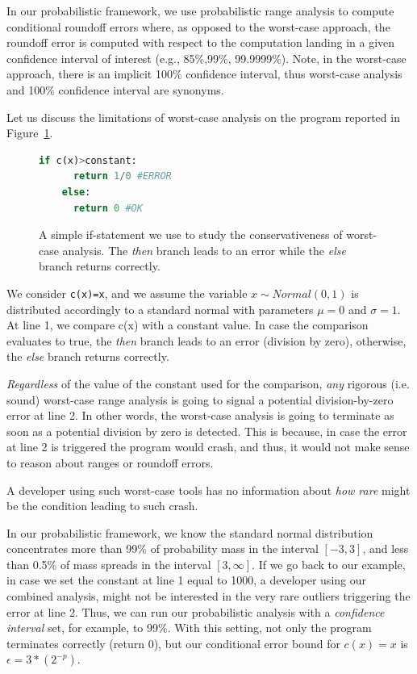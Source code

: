 In our probabilistic framework, we use probabilistic range analysis to compute conditional roundoff errors where, as opposed to the worst-case approach, the roundoff error is computed with respect to the computation landing in a given confidence interval of interest (e.g., 85\%,99\%, 99.9999\%).
%
Note, in the worst-case approach, there is an implicit 100\% confidence interval, thus worst-case analysis and 100\% confidence interval are synonyms.
%

%
Let us discuss the limitations of worst-case analysis on the program reported in Figure~\ref{fig:prob}.
%
\begin{figure}[tb!]
	\begin{lstlisting}[frame=single, language=Python]
	if c(x)>constant:
	  return 1/0 #ERROR
	else:
	  return 0 #OK
	\end{lstlisting}
	\caption{A simple if-statement we use to study the conservativeness of worst-case analysis. The \emph{then} branch leads to an error while the \emph{else} branch returns correctly.}
	\label{fig:prob}
\end{figure}
%
We consider \lstinline{c(x)=x}, and we assume the variable $x\sim Normal(0,1)$ is distributed accordingly to a standard normal with parameters $\mu = 0$ and $\sigma = 1$.
%
At line 1, we compare c(x) with a constant value.
%
In case the comparison evaluates to true, the \emph{then} branch leads to an error (division by zero), otherwise, the \emph{else} branch returns correctly.
%

\emph{Regardless} of the value of the constant used for the comparison, \emph{any} rigorous (i.e. sound) worst-case range analysis is going to signal a potential division-by-zero error at line 2.
%
In other words, the worst-case analysis is going to terminate as soon as a potential division by zero is detected.
%
This is because, in case the error at line 2 is triggered the program would crash, and thus, it would not make sense to reason about ranges or roundoff errors.

%
A developer using such worst-case tools has no information about \emph{how rare} might be the condition leading to such crash. 
%

In our probabilistic framework, we know the standard normal distribution concentrates more than 99\% of probability mass in the interval $[−3, 3]$, and less than 0.5\% of mass spreads in the interval $[3, \infty]$.
%
If we go back to our example, in case we set the constant at line 1 equal to 1000, a developer using our combined analysis, might not be interested in the very rare outliers triggering the error at line 2.
%
Thus, we can run our probabilistic analysis with a \emph{confidence interval} set, for example, to 99\%.
%
%
With this setting, not only the program terminates correctly (return 0), but our conditional error bound for $c(x)=x$ is $\epsilon = 3*(2^{-p})$.
%

